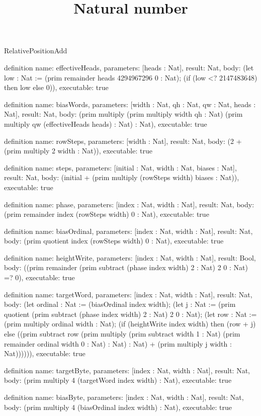 \begin{lexlean}{RelativePositionAdd}
\title{Natural number}
\begin{semanticmodule}
definition{
  name: effectiveHeads,
  parameters: [heads : Nat],
  result: Nat,
  body: (let low : Nat := (prim remainder heads 4294967296 0 : Nat); (if (low <? 2147483648) then low else 0)),
  executable: true
}

definition{
  name: biasWords,
  parameters: [width : Nat, qh : Nat, qw : Nat, heads : Nat],
  result: Nat,
  body: (prim multiply (prim multiply width qh : Nat) (prim multiply qw (effectiveHeads heads) : Nat) : Nat),
  executable: true
}

definition{
  name: rowSteps,
  parameters: [width : Nat],
  result: Nat,
  body: (2 + (prim multiply 2 width : Nat)),
  executable: true
}

definition{
  name: steps,
  parameters: [initial : Nat, width : Nat, biases : Nat],
  result: Nat,
  body: (initial + (prim multiply (rowSteps width) biases : Nat)),
  executable: true
}

definition{
  name: phase,
  parameters: [index : Nat, width : Nat],
  result: Nat,
  body: (prim remainder index (rowSteps width) 0 : Nat),
  executable: true
}

definition{
  name: biasOrdinal,
  parameters: [index : Nat, width : Nat],
  result: Nat,
  body: (prim quotient index (rowSteps width) 0 : Nat),
  executable: true
}

definition{
  name: heightWrite,
  parameters: [index : Nat, width : Nat],
  result: Bool,
  body: ((prim remainder (prim subtract (phase index width) 2 : Nat) 2 0 : Nat) =? 0),
  executable: true
}

definition{
  name: targetWord,
  parameters: [index : Nat, width : Nat],
  result: Nat,
  body: (let ordinal : Nat := (biasOrdinal index width); (let j : Nat := (prim quotient (prim subtract (phase index width) 2 : Nat) 2 0 : Nat); (let row : Nat := (prim multiply ordinal width : Nat); (if (heightWrite index width) then (row + j) else ((prim subtract row (prim multiply (prim subtract width 1 : Nat) (prim remainder ordinal width 0 : Nat) : Nat) : Nat) + (prim multiply j width : Nat)))))),
  executable: true
}

definition{
  name: targetByte,
  parameters: [index : Nat, width : Nat],
  result: Nat,
  body: (prim multiply 4 (targetWord index width) : Nat),
  executable: true
}

definition{
  name: biasByte,
  parameters: [index : Nat, width : Nat],
  result: Nat,
  body: (prim multiply 4 (biasOrdinal index width) : Nat),
  executable: true
}


\end{semanticmodule}
\end{lexlean}

